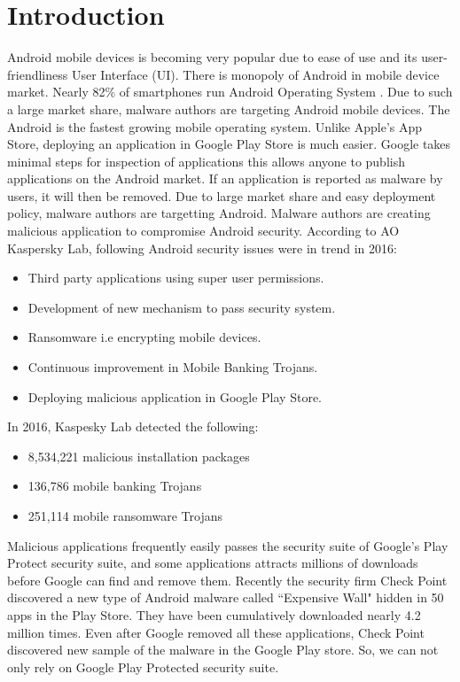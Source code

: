 \chapter{Introduction}
\label{ch:intro}

\thispagestyle{empty}
Android mobile devices is becoming very popular due to ease of use and its user-friendliness User Interface (UI). There is monopoly of Android in mobile device market. Nearly 82\% of smartphones run Android Operating System \cite{smartphoneos} . Due to such a large market share, malware authors are targeting Android mobile devices. The Android is the fastest growing mobile operating system. Unlike Apple's App Store, deploying an application in Google Play Store is much easier. Google takes minimal steps for inspection of applications this allows anyone to publish applications on the Android market. If an application is reported as malware by users, it will then be removed. Due to large market share and easy deployment policy, malware authors are targetting Android. Malware authors are creating malicious application to compromise Android security. According to AO Kaspersky Lab, following Android security issues were in trend in 2016:
\begin{itemize}
    \item Third party applications using super user permissions.
    \item Development of new mechanism to pass security system.
    \item Ransomware i.e encrypting mobile devices.
    \item Continuous improvement in Mobile Banking Trojans.
    \item Deploying malicious application in Google Play Store.
\end{itemize}
\newline
In 2016, Kaspesky Lab detected the following:
\begin{itemize}
    \item 8,534,221 malicious installation packages
    \item 136,786 mobile banking Trojans
    \item 251,114 mobile ransomware Trojans
\end{itemize}


Malicious applications frequently easily passes the security suite of Google's Play Protect security suite, and some applications attracts millions of downloads before Google can find and remove them. Recently the security firm Check Point discovered a new type of Android malware called ``Expensive Wall" hidden in 50 apps in the Play Store. They have been cumulatively downloaded nearly 4.2 million times. Even after Google removed all these applications, Check Point discovered new sample of the malware in the Google Play store. So, we can not only rely on Google Play Protected security suite.\\

